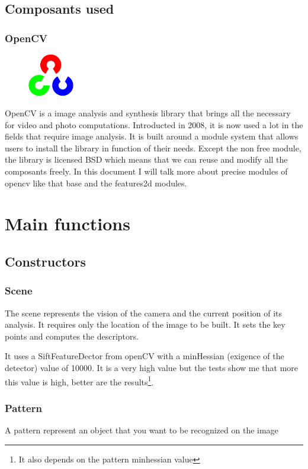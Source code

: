 \documentclass[english,a4paper,11pt]{report}
\begin{document}
\section{Composants used}
\newpage
\subsection{OpenCV}
\begin{figure}
\vspace{-7mm}
\includegraphics[width=2cm]{images_not_compressed/opencv_logo.png}
\end{figure}
OpenCV is a image analysis and synthesis library that brings all the necessary for video and photo computations. Introducted in 2008, it is now used a lot in the fields that require image analysis.
It is built around a module system that allows users to install the library in function of their needs.
Except the non free module, the library is licensed BSD which means that we can reuse and modify all the composants freely.
In this document I will talk more about precise modules of opencv like that base and the features2d modules. 

\chapter{Main functions}
\section{Constructors}
\subsection{Scene}
\par The scene represents the vision of the camera and the current position of its analysis. 
It requires only the location of the image to be built. It sets the key points and computes the descriptors. 
\par It uses a SiftFeatureDector from openCV with a minHessian (exigence of the detector) value of 10000. It is a very high value but the tests show me that more this value is high, better are the results\footnote{It also depends on the pattern minhessian value}.
\subsection{Pattern}
A pattern represent an object that you want to be recognized on the image
\end{document}
